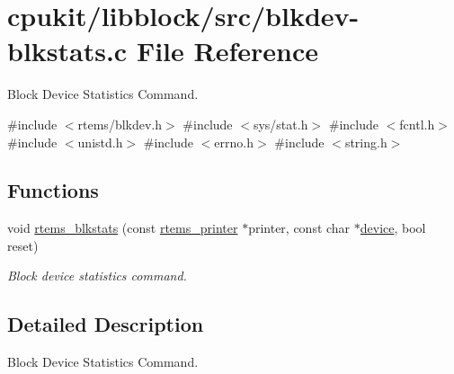\hypertarget{blkdev-blkstats_8c}{}\section{cpukit/libblock/src/blkdev-\/blkstats.c File Reference}
\label{blkdev-blkstats_8c}


Block Device Statistics Command.  


{\ttfamily \#include $<$rtems/blkdev.\+h$>$}\newline
{\ttfamily \#include $<$sys/stat.\+h$>$}\newline
{\ttfamily \#include $<$fcntl.\+h$>$}\newline
{\ttfamily \#include $<$unistd.\+h$>$}\newline
{\ttfamily \#include $<$errno.\+h$>$}\newline
{\ttfamily \#include $<$string.\+h$>$}\newline
\subsection*{Functions}
\begin{DoxyCompactItemize}
\item 
void \mbox{\hyperlink{group__rtems__blkdev_gac171a347539842982856bb7b32dd4e76}{rtems\+\_\+blkstats}} (const \mbox{\hyperlink{structrtems__printer}{rtems\+\_\+printer}} $\ast$printer, const char $\ast$\mbox{\hyperlink{structdevice}{device}}, bool reset)
\begin{DoxyCompactList}\small\item\em Block device statistics command. \end{DoxyCompactList}\end{DoxyCompactItemize}


\subsection{Detailed Description}
Block Device Statistics Command. 

